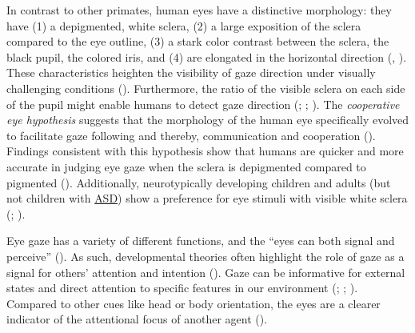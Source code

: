 \documentclass[
]{scrbook}
\begin{document}
In contrast to other primates, human eyes have a distinctive morphology: they have (1) a depigmented, white sclera, (2) a large exposition of the sclera compared to the eye outline, (3) a stark color contrast between the sclera, the black pupil, the colored iris, and (4) are elongated in the horizontal direction (, ). These characteristics heighten the visibility of gaze direction under visually challenging conditions (). Furthermore, the ratio of the visible sclera on each side of the pupil might enable humans to detect gaze direction (; ; ). The \emph{cooperative eye hypothesis} suggests that the morphology of the human eye specifically evolved to facilitate gaze following and thereby, communication and cooperation (). Findings consistent with this hypothesis show that humans are quicker and more accurate in judging eye gaze when the sclera is depigmented compared to pigmented (). Additionally, neurotypically developing children and adults (but not children with \hyperref[acronyms_ASD]{ASD}) show a preference for eye stimuli with visible white sclera (; ).

Eye gaze has a variety of different functions, and the ``eyes can both signal and perceive'' (). As such, developmental theories often highlight the role of gaze as a signal for others' attention and intention (). Gaze can be informative for external states and direct attention to specific features in our environment (; ; ). Compared to other cues like head or body orientation, the eyes are a clearer indicator of the attentional focus of another agent ().
\end{document}
